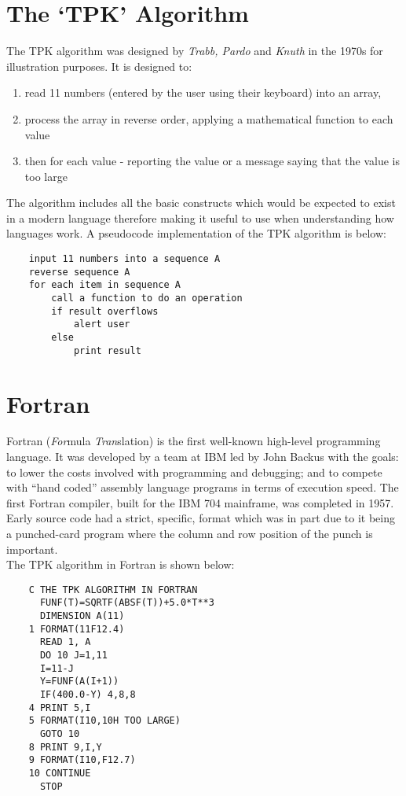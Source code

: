 
\section{The `TPK' Algorithm}
The TPK algorithm was designed by \textit{Trabb, Pardo} and \textit{Knuth} in the 1970s for illustration purposes. It is designed to:
\begin{enumerate}
    \item read 11 numbers (entered by the user using their keyboard) into an array,
    \item process the array in reverse order, applying a mathematical function to each value
    \item then for each value - reporting the value or a message saying that the value is too large
\end{enumerate}
The algorithm includes all the basic constructs which would be expected to exist in a modern language therefore making it useful to use when understanding how languages work. A pseudocode implementation of the TPK algorithm is below:
\begin{verbatim}
    input 11 numbers into a sequence A
    reverse sequence A
    for each item in sequence A
        call a function to do an operation
        if result overflows
            alert user
        else
            print result
\end{verbatim}

\section{Fortran}
Fortran (\textit{For}mula \textit{Tran}slation) is the first well-known high-level programming language. It was developed by a team at IBM led by John Backus with the goals: to lower the costs involved with programming and debugging; and to compete with ``hand coded'' assembly language programs in terms of execution speed. The first Fortran compiler, built for the IBM 704 mainframe, was completed in 1957. \\

Early source code had a strict, specific, format which was in part due to it being a punched-card program where the column and row position of the punch is important.\\

The TPK algorithm in Fortran is shown below:
\begin{verbatim}
    C THE TPK ALGORITHM IN FORTRAN
      FUNF(T)=SQRTF(ABSF(T))+5.0*T**3
      DIMENSION A(11)
    1 FORMAT(11F12.4)
      READ 1, A
      DO 10 J=1,11
      I=11-J
      Y=FUNF(A(I+1))
      IF(400.0-Y) 4,8,8
    4 PRINT 5,I
    5 FORMAT(I10,10H TOO LARGE)
      GOTO 10
    8 PRINT 9,I,Y
    9 FORMAT(I10,F12.7)
    10 CONTINUE
      STOP
\end{verbatim}

